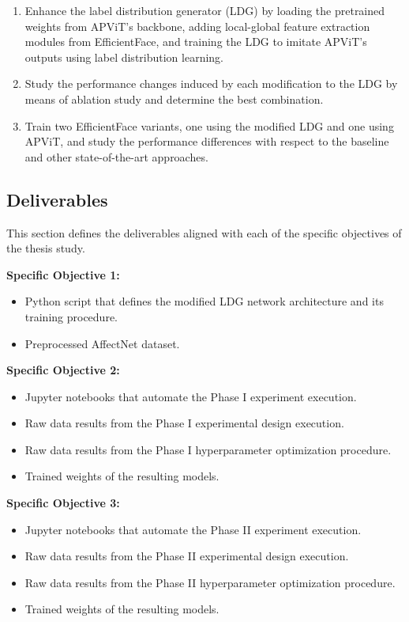 \begin{enumerate}
    \item Enhance the label distribution generator (LDG) by loading the pretrained weights from APViT's backbone, adding local-global feature extraction modules from EfficientFace, and training the LDG to imitate APViT's outputs using label distribution learning.

    \item Study the performance changes induced by each modification to the LDG by means of ablation study and determine the best combination.
    
    \item Train two EfficientFace variants, one using the modified LDG and one using APViT, and study the performance differences with respect to the baseline and other state-of-the-art approaches.
    
\end{enumerate}

\subsection{Deliverables}
This section defines the deliverables aligned with each of the specific objectives of the thesis study.

\textbf{Specific Objective 1:}
\begin{itemize}
    \item Python script that defines the modified LDG network architecture and its training procedure.
    \item Preprocessed AffectNet dataset.
\end{itemize}

\textbf{Specific Objective 2:}
\begin{itemize}
    \item Jupyter notebooks that automate the Phase I experiment execution.
    \item Raw data results from the Phase I experimental design execution.
    \item Raw data results from the Phase I hyperparameter optimization procedure.
    \item Trained weights of the resulting models.
\end{itemize}

\textbf{Specific Objective 3:}
\begin{itemize}
    \item Jupyter notebooks that automate the Phase II experiment execution.
    \item Raw data results from the Phase II experimental design execution.
    \item Raw data results from the Phase II hyperparameter optimization procedure.
    \item Trained weights of the resulting models.
\end{itemize}

